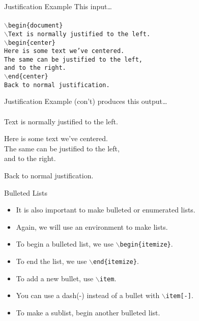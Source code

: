 \documentclass[pdf]{prosper}
\begin{document}
\begin{slide}{Justification Example}
This input\ldots \\
\\
			\texttt{$\backslash$begin\{document\}} \\
			\texttt{$\backslash$Text is normally justified to the left.} \\
			\texttt{$\backslash$begin\{center\}} \\
			\texttt{Here is some text we've centered.} \\
			\texttt{The same can be justified to the left,} \\
			\texttt{and to the right.} \\
			\texttt{$\backslash$end\{center\}} \\
			\texttt{Back to normal justification.} \\
\end{slide}
\begin{slide}{Justification Example (con't)}
produces this output\dots \\
\\
	Text is normally justified to the left. \\
	\begin{center}
		Here is some text we've centered. \\
		The same can be justified to the left, \\
		and to the right.
	\end{center}
	Back to normal justification.
\end{slide}
\begin{slide}{Bulleted Lists}
	\begin{itemize}
		\item It is also important to make bulleted or enumerated lists.
		\item Again, we will use an environment to make lists.
		\item To begin a bulleted list, we use \texttt{$\backslash$begin\{itemize\}}.
		\item To end the list, we use \texttt{$\backslash$end\{itemize\}}.
		\item To add a new bullet, use \texttt{$\backslash$item}.
		\item You can use a dash(-) instead of a bullet with \texttt{$\backslash$item[-]}.
		\item To make a sublist, begin another bulleted list.
	\end{itemize}
\end{slide}
\end{document}
